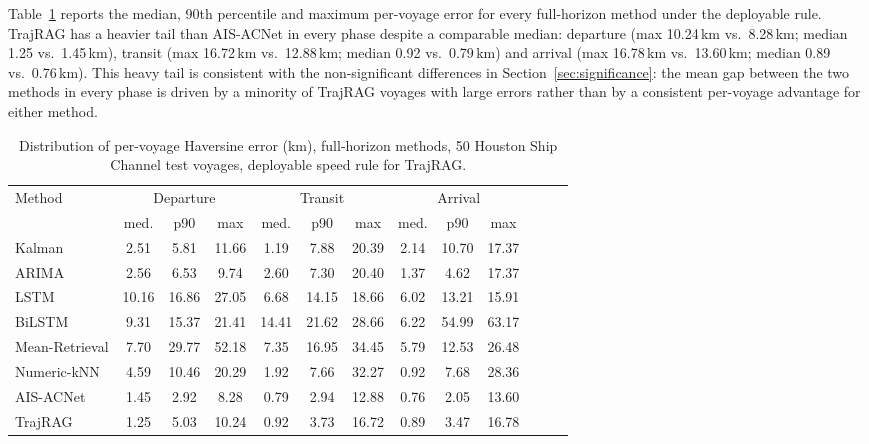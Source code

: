 Table~\ref{tab:distribution} reports the median, 90th percentile and
maximum per-voyage error for every full-horizon method under the deployable
rule. TrajRAG has a heavier tail than AIS-ACNet in every phase despite a
comparable median: departure (max 10.24\,km vs.\ 8.28\,km; median 1.25 vs.\
1.45\,km), transit (max 16.72\,km vs.\ 12.88\,km; median 0.92 vs.\
0.79\,km) and arrival (max 16.78\,km vs.\ 13.60\,km; median 0.89 vs.\
0.76\,km). This heavy tail is consistent with the non-significant
differences in Section~\ref{sec:significance}: the mean gap between the two
methods in every phase is driven by a minority of TrajRAG voyages with
large errors rather than by a consistent per-voyage advantage for either
method.

\begin{table}[t]
\centering
\caption{Distribution of per-voyage Haversine error (km), full-horizon
methods, 50 Houston Ship Channel test voyages, deployable speed rule for
TrajRAG.}
\label{tab:distribution}
\footnotesize
\setlength{\tabcolsep}{3pt}
\begin{tabular}{lcccccccccccc}
\toprule
\multirow{2}{*}{Method} & \multicolumn{3}{c}{Departure} & \multicolumn{3}{c}{Transit} & \multicolumn{3}{c}{Arrival} \\
\cmidrule(lr){2-4}\cmidrule(lr){5-7}\cmidrule(lr){8-10}
 & med. & p90 & max & med. & p90 & max & med. & p90 & max \\
\midrule
Kalman       & 2.51 & 5.81  & 11.66 & 1.19 & 7.88  & 20.39 & 2.14 & 10.70 & 17.37 \\
ARIMA        & 2.56 & 6.53  & 9.74  & 2.60 & 7.30  & 20.40 & 1.37 & 4.62  & 17.37 \\
LSTM         & 10.16 & 16.86 & 27.05 & 6.68 & 14.15 & 18.66 & 6.02 & 13.21 & 15.91 \\
BiLSTM       & 9.31 & 15.37 & 21.41 & 14.41 & 21.62 & 28.66 & 6.22 & 54.99 & 63.17 \\
Mean-Retrieval & 7.70 & 29.77 & 52.18 & 7.35 & 16.95 & 34.45 & 5.79 & 12.53 & 26.48 \\
Numeric-kNN  & 4.59 & 10.46 & 20.29 & 1.92 & 7.66  & 32.27 & 0.92 & 7.68  & 28.36 \\
AIS-ACNet    & 1.45 & 2.92  & 8.28  & 0.79 & 2.94  & 12.88 & 0.76 & 2.05  & 13.60 \\
TrajRAG      & 1.25 & 5.03  & 10.24 & 0.92 & 3.73  & 16.72 & 0.89 & 3.47  & 16.78 \\
\bottomrule
\end{tabular}
\end{table}

